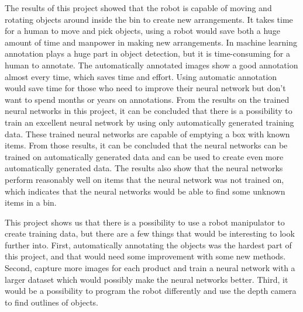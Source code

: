 The results of this project showed that the robot is capable of moving and rotating objects around inside the bin to create new arrangements. It takes time for a human to move and pick objects, using a robot would save both a huge amount of time and manpower in making new arrangements.
In machine learning annotation plays a huge part in object detection, but it is time-consuming for a human to annotate.
The automatically annotated images show a good annotation almost every time, which saves time and effort. 
Using automatic annotation would save time for those who need to improve their neural network but don't want to spend months or years on annotations.
From the results on the trained neural networks in this project, it can be concluded that there is a possibility to train an excellent neural network by using only automatically generated training data. 
These trained neural networks are capable of emptying a box with known items.
From those results, it can be concluded that the neural networks can be trained on automatically generated data and can be used to create even more automatically generated data. 
The results also show that the neural networks perform reasonably well on items that the neural network was not trained on, which indicates that the neural networks would be able to find some unknown items in a bin.

This project shows us that there is a possibility to use a robot manipulator to create training data, but there are a few things that would be interesting to look further into. First, automatically annotating the objects was the hardest part of this project, and that would need some improvement with some new methods. Second, capture more images for each product and train a neural network with a larger dataset which would possibly make the neural networks better. Third, it would be a possibility to program the robot differently and use the depth camera to find outlines of objects.
